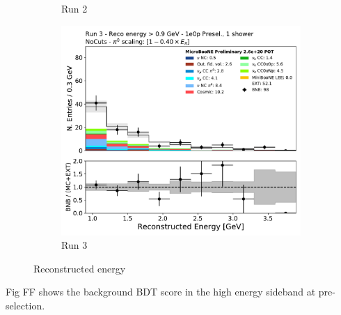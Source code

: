 \begin{figure}[H]
\begin{subfigure}{0.3\textwidth}
    \caption{Run 2}
    \end{subfigure}
    \begin{subfigure}{0.3\textwidth}
    \includegraphics[width=1.0\textwidth]{1e0p/High_E_Sideband/run3/reco_e_highe.pdf}
    \caption{Run 3}
    \end{subfigure}
    \caption{Reconstructed energy} 
    \label{fig:low_0pbdt_sideband_plots}
\end{figure}

Fig FF shows the background BDT score in the high energy sideband at pre-selection.

